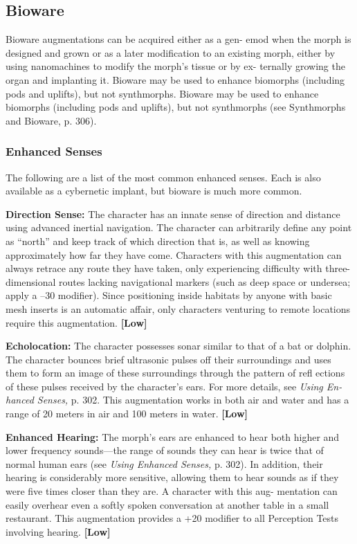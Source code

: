 \subsection{Bioware}

Bioware augmentations can be acquired either as a gen-
emod when the morph is designed and grown or as a 
later modification to an existing morph, either by using 
nanomachines to modify the morph's tissue or by ex-
ternally growing the organ and implanting it. Bioware 
may be used to enhance biomorphs (including pods and 
uplifts), but not synthmorphs. Bioware may be used to 
enhance biomorphs (including pods and uplifts), but not 
synthmorphs (see Synthmorphs and Bioware, p. 306).

\subsubsection{Enhanced Senses}

The following are a list of the most common enhanced 
senses. Each is also available as a cybernetic implant, 
but bioware is much more common.

\textbf{Direction Sense:} The character has an innate sense 
of direction and distance using advanced inertial 
navigation. The character can arbitrarily define any 
point as ``north'' and keep track of which direction 
that is, as well as knowing approximately how far 
they have come. Characters with this augmentation 
can always retrace any route they have taken, only 
experiencing difficulty with three-dimensional routes 
lacking navigational markers (such as deep space or 
undersea; apply a –30 modifier). Since positioning 
inside habitats by anyone with basic mesh inserts is an 
automatic affair, only characters venturing to remote 
locations require this augmentation. \textbf{[Low]}

\textbf{Echolocation:} The character possesses sonar similar 
to that of a bat or dolphin. The character bounces 
brief ultrasonic pulses off their surroundings and uses 
them to form an image of these surroundings through 
the pattern of refl ections of these pulses received by 
the character's ears. For more details, see \textit{Using En-}
\textit{hanced Senses,} p. 302. This augmentation works in 
both air and water and has a range of 20 meters in air 
and 100 meters in water. \textbf{[Low]}

\textbf{Enhanced Hearing:} The morph's ears are enhanced 
to hear both higher and lower frequency sounds—the 
range of sounds they can hear is twice that of normal 
human ears (see \textit{Using Enhanced Senses,} p. 302). In 
addition, their hearing is considerably more sensitive, 
allowing them to hear sounds as if they were five 
times closer than they are. A character with this aug-
mentation can easily overhear even a softly spoken 
conversation at another table in a small restaurant. 
This augmentation provides a +20 modifier to all 
Perception Tests involving hearing. \textbf{[Low]}

